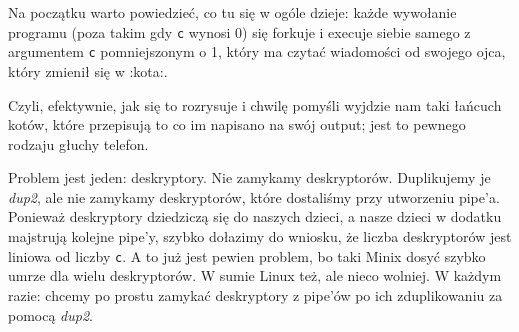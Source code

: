 Na początku warto powiedzieć, co tu się w ogóle dzieje: każde wywołanie programu (poza takim gdy \texttt{c} wynosi 0) się forkuje i execuje siebie samego z argumentem \texttt{c} pomniejszonym o 1, który ma czytać wiadomości od swojego ojca, który zmienił się w :kota:.

Czyli, efektywnie, jak się to rozrysuje i chwilę pomyśli wyjdzie nam taki łańcuch kotów, które przepisują to co im napisano na swój output; jest to pewnego rodzaju głuchy telefon. 

Problem jest jeden: deskryptory. Nie zamykamy deskryptorów. Duplikujemy je \textit{dup2}, ale nie zamykamy deskryptorów, które dostaliśmy przy utworzeniu pipe'a. Ponieważ deskryptory dziedziczą się do naszych dzieci, a nasze dzieci w dodatku majstrują kolejne pipe'y, szybko dołazimy do wniosku, że liczba deskryptorów jest liniowa od liczby \texttt{c}. A to już jest pewien problem, bo taki Minix dosyć szybko umrze dla wielu deskryptorów. W sumie Linux też, ale nieco wolniej. W każdym razie: chcemy po prostu zamykać deskryptory z pipe'ów po ich zduplikowaniu za pomocą \textit{dup2}. 